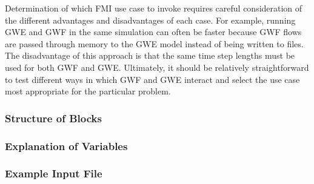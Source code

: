 \noindent Determination of which FMI use case to invoke requires careful consideration of the different advantages and disadvantages of each case.  For example, running GWE and GWF in the same simulation can often be faster because GWF flows are passed through memory to the GWE model instead of being written to files.  The disadvantage of this approach is that the same time step lengths must be used for both GWF and GWE.  Ultimately, it should be relatively straightforward to test different ways in which GWF and GWE interact and select the use case most appropriate for the particular problem. 

\vspace{5mm}
\subsubsection{Structure of Blocks}



\vspace{5mm}
\subsubsection{Explanation of Variables}
\begin{description}

\end{description}

\vspace{5mm}
\subsubsection{Example Input File}



